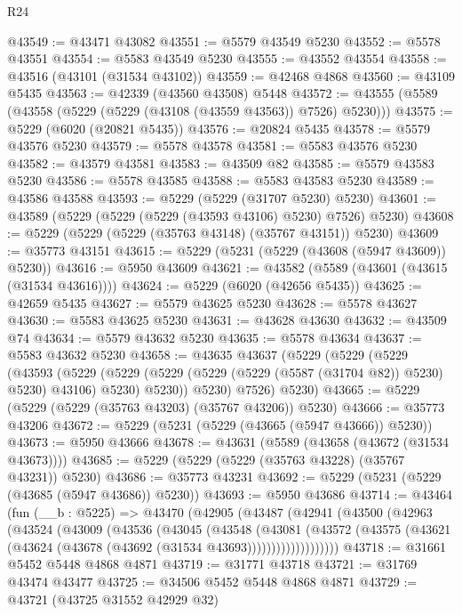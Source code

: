 \begin{lexlean}{R24}
\begin{coremodule}
@43549 := @43471 @43082
@43551 := @5579 @43549 @5230
@43552 := @5578 @43551
@43554 := @5583 @43549 @5230
@43555 := @43552 @43554
@43558 := @43516 (@43101 (@31534 @43102))
@43559 := @42468 @4868
@43560 := @43109 @5435
@43563 := @42339 (@43560 @43508) @5448
@43572 := @43555 (@5589 (@43558 (@5229 (@5229 (@43108 (@43559 @43563)) @7526) @5230)))
@43575 := @5229 (@6020 (@20821 @5435))
@43576 := @20824 @5435
@43578 := @5579 @43576 @5230
@43579 := @5578 @43578
@43581 := @5583 @43576 @5230
@43582 := @43579 @43581
@43583 := @43509 @82
@43585 := @5579 @43583 @5230
@43586 := @5578 @43585
@43588 := @5583 @43583 @5230
@43589 := @43586 @43588
@43593 := @5229 (@5229 (@31707 @5230) @5230)
@43601 := @43589 (@5229 (@5229 (@5229 (@43593 @43106) @5230) @7526) @5230)
@43608 := @5229 (@5229 (@5229 (@35763 @43148) (@35767 @43151)) @5230)
@43609 := @35773 @43151
@43615 := @5229 (@5231 (@5229 (@43608 (@5947 @43609)) @5230))
@43616 := @5950 @43609
@43621 := @43582 (@5589 (@43601 (@43615 (@31534 @43616))))
@43624 := @5229 (@6020 (@42656 @5435))
@43625 := @42659 @5435
@43627 := @5579 @43625 @5230
@43628 := @5578 @43627
@43630 := @5583 @43625 @5230
@43631 := @43628 @43630
@43632 := @43509 @74
@43634 := @5579 @43632 @5230
@43635 := @5578 @43634
@43637 := @5583 @43632 @5230
@43658 := @43635
    @43637
    (@5229
      (@5229
        (@5229
          (@43593
            (@5229
              (@5229 (@5229 (@5229 (@5229 (@5587 (@31704 @82)) @5230) @5230) @43106) @5230)
              @5230))
          @5230)
        @7526)
      @5230)
@43665 := @5229 (@5229 (@5229 (@35763 @43203) (@35767 @43206)) @5230)
@43666 := @35773 @43206
@43672 := @5229 (@5231 (@5229 (@43665 (@5947 @43666)) @5230))
@43673 := @5950 @43666
@43678 := @43631 (@5589 (@43658 (@43672 (@31534 @43673))))
@43685 := @5229 (@5229 (@5229 (@35763 @43228) (@35767 @43231)) @5230)
@43686 := @35773 @43231
@43692 := @5229 (@5231 (@5229 (@43685 (@5947 @43686)) @5230))
@43693 := @5950 @43686
@43714 := @43464
    (fun (__b : @5225) =>
    @43470
      (@42905
        (@43487
          (@42941
            (@43500
              (@42963
                (@43524
                  (@43009
                    (@43536
                      (@43045
                        (@43548
                          (@43081
                            (@43572
                              (@43575
                                (@43621 (@43624 (@43678 (@43692 (@31534 @43693)))))))))))))))))))
@43718 := @31661 @5452 @5448 @4868 @4871
@43719 := @31771 @43718
@43721 := @31769 @43474 @43477
@43725 := @34506 @5452 @5448 @4868 @4871
@43729 := @43721 (@43725 @31552 @42929 @32)

\end{coremodule}
\end{lexlean}
